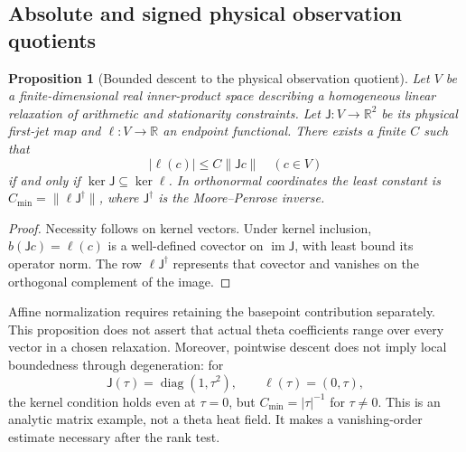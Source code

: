 \documentclass[11pt]{article}
\numberwithin{equation}{section}
\newtheorem{proposition}[theorem]{Proposition}
\theoremstyle{definition}
\theoremstyle{remark}
\newcommand{\R}{\mathbb R}
\begin{document}
\subsection{Absolute and signed physical observation quotients}

\begin{proposition}[Bounded descent to the physical observation quotient]
\label{obs:quotient-norm}
Let $V$ be a finite-dimensional real inner-product space describing a
homogeneous linear relaxation of arithmetic and stationarity
constraints.  Let $\mathsf J:V\to\R^2$ be its physical first-jet map
and $\ell:V\to\R$ an endpoint functional.
There exists a finite $C$ such that
\begin{equation}
 |\ell(c)|\le C\|\mathsf Jc\|\quad(c\in V)
 \label{obs:quotient-bound}
\end{equation}
if and only if $\ker\mathsf J\subseteq\ker\ell$.
In orthonormal coordinates the least constant is
$C_{\min}=\|\ell\mathsf J^\dagger\|$, where
$\mathsf J^\dagger$ is the Moore--Penrose inverse.
\end{proposition}
\begin{proof}
Necessity follows on kernel vectors.  Under kernel inclusion,
$b(\mathsf Jc)=\ell(c)$ is a well-defined covector on
$\operatorname{im}\mathsf J$, with least bound its operator norm.
The row $\ell\mathsf J^\dagger$ represents that covector and
vanishes on the orthogonal complement of the image.
\end{proof}

Affine normalization requires retaining the basepoint contribution
separately.  This proposition does not assert that actual theta
coefficients range over every vector in a chosen relaxation.
Moreover, pointwise descent does not imply local boundedness through
degeneration: for
\[
 \mathsf J(\tau)=\operatorname{diag}(1,\tau^2),\qquad
 \ell(\tau)=(0,\tau),
\]
the kernel condition holds even at $\tau=0$, but
$C_{\min}=|\tau|^{-1}$ for $\tau\ne0$.
This is an analytic matrix example, not a theta heat field.
It makes a vanishing-order estimate necessary after the rank test.
\end{document}
